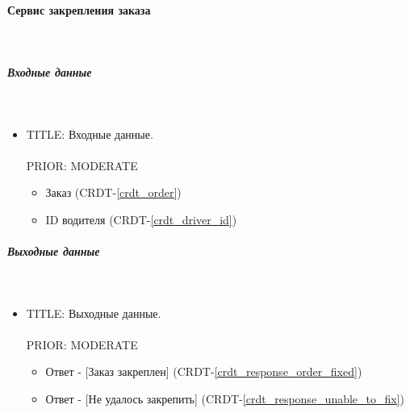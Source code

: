 \paragraph{Сервис закрепления заказа} \mbox{} \\ \label{fasten_order_service}

	\subparagraph{Входные данные} \mbox{} \\ \label{}

      \begin{itemize}

        \item{

          TITLE: Входные данные.\\
          \\
          PRIOR: MODERATE\\

        }

        \begin{itemize}
          \item Заказ (CRDT-\ref{crdt_order})
          \item ID водителя (CRDT-\ref{crdt_driver_id})
        \end{itemize}

      \end{itemize}

    \subparagraph{Выходные данные} \mbox{} \\

      \begin{itemize}

        \item{

          TITLE: Выходные данные.\\
          \\
          PRIOR: MODERATE\\

        }

        \begin{itemize}
          \item Ответ - [Заказ закреплен] (CRDT-\ref{crdt_response_order_fixed})
          \item Ответ - [Не удалось закрепить] (CRDT-\ref{crdt_response_unable_to_fix})
        \end{itemize}

      \end{itemize}

